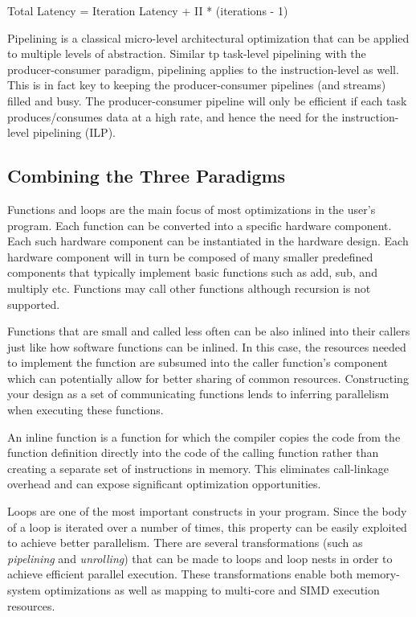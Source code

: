 \begin{highlight}
  Total Latency = Iteration Latency + II * (iterations - 1)  
\end{highlight}

Pipelining is a classical micro-level architectural optimization that can be applied to multiple levels of abstraction. Similar tp task-level pipelining with the producer-consumer paradigm, pipelining applies to the instruction-level as well. This is in fact key to keeping the producer-consumer pipelines (and streams) filled and busy. The producer-consumer pipeline will only be efficient if each task produces/consumes data at a high rate, and hence the need for the
instruction-level pipelining (ILP).

\subsection{Combining the Three Paradigms}
Functions and loops are the main focus of most optimizations in the user's program. Each function can be
converted into a specific hardware component. Each such hardware component can be instantiated in
the hardware design. Each hardware component will in turn be composed of many
smaller predefined components that typically implement basic functions such as add, sub, and
multiply etc. Functions may call other functions although recursion is not supported. 

\par Functions that
are small and called less often can be also inlined into their callers just like how software
functions can be inlined. In this case, the resources needed to implement the function are
subsumed into the caller function's component which can potentially allow for better sharing of
common resources. Constructing your design as a set of communicating functions lends to inferring parallelism when executing these functions.

\begin{highlight}
  An inline function is a function for which the compiler copies the code from the function definition directly into the code of the calling function rather than creating a separate set of instructions in memory. This eliminates call-linkage overhead and can expose significant optimization opportunities.   
\end{highlight}

Loops are one of the most important constructs in your program. Since the body of a loop is
iterated over a number of times, this property can be easily exploited to achieve better
parallelism. There are several transformations (such as {\it pipelining} and {\it unrolling}) that can be made
to loops and loop nests in order to achieve efficient parallel execution. These transformations
enable both memory-system optimizations as well as mapping to multi-core and SIMD execution
resources.

